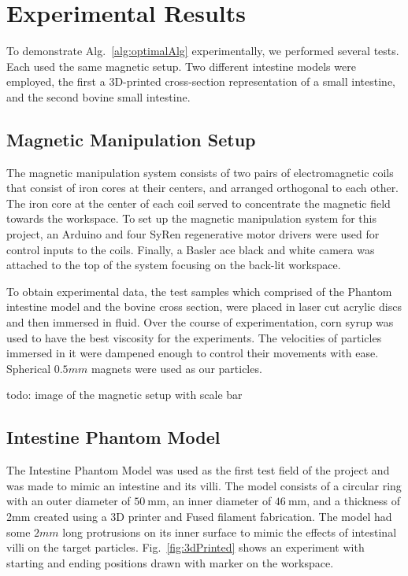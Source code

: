 
\section{Experimental Results}\label{sec:expResults}

To demonstrate Alg.~\ref{alg:optimalAlg} experimentally, we performed several tests.
Each used the same magnetic setup.
 Two different intestine models were employed, the first a 3D-printed cross-section representation of a small intestine, and the second bovine small intestine.
 
 \subsection{Magnetic Manipulation Setup}
 
 The magnetic manipulation system consists of two pairs of electromagnetic coils that consist of iron cores at their centers, and arranged orthogonal to each other. The iron core at the center of each coil served to concentrate the magnetic field towards the workspace. To set up the magnetic manipulation system for this project, an Arduino and four SyRen regenerative motor drivers were used for control inputs to the coils. Finally, a Basler ace black and white camera was attached to the top of the system focusing on the back-lit workspace. 
 
To obtain experimental data, the test samples which comprised of the Phantom intestine model and the bovine cross section, were placed in laser cut acrylic discs and then immersed in fluid. Over the course of experimentation, corn syrup was used to have the best viscosity for the experiments. The velocities of particles immersed in it were dampened enough to control their movements with ease. Spherical $0.5 mm$ magnets were used as our particles.
 

todo: image of the magnetic setup with scale bar


\subsection{Intestine Phantom Model}

The Intestine Phantom Model was used as the first test field of the project and was made to mimic an intestine and its villi. The model consists of a circular ring with an outer diameter of $\SI{50}{\milli\metre}$, an inner diameter of $\SI{46}{\milli\metre}$, and a thickness of 2mm created using a 3D printer and Fused filament fabrication. The model had some $2 mm$ long protrusions on its inner surface to mimic the effects of intestinal villi on the target particles. Fig.~\ref{fig:3dPrinted} shows an experiment with starting and ending positions drawn with marker on the workspace. 

